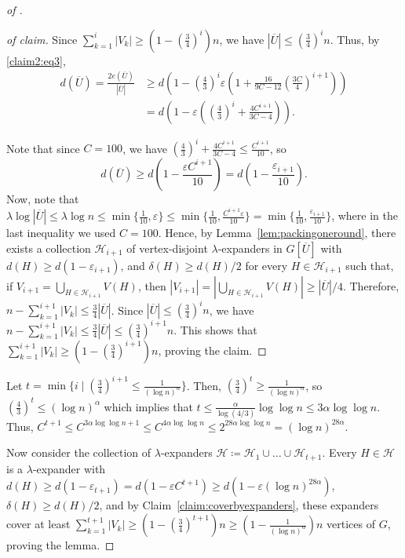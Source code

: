 \documentclass[10pt,a4paper]{amsart}
\newcommand{\cH}{\mathcal{H}}
\newcommand{\eps}{\varepsilon}
\begin{document}
\begin{proof}[ of ]
\begin{proof}[ of claim]
		Since $\sum_{k = 1}^i |V_k| \ge (1 - (\frac{3}{4})^i)n$, we have $|\overline{U}| \le (\frac{3}{4})^i n$. Thus, by \eqref{claim2:eq3}, 
		\begin{align*}
			d(\overline{U}) 
			= \frac{2 e(\overline{U})}{|\overline{U}|} 
			& \ge d\left(1 - \left(\frac{4}{3}\right)^i \eps \left(1 + \frac{16}{9C - 12} \left(\frac{3 C}{4}\right)^{i+1}  \right) \right) \\
			& = d \left(1 - \eps \left(\left(\frac{4}{3}\right)^i + \frac{4 C^{i+1}}{3C - 4}\right) \right).
		\end{align*}

		Note that since $C = 100$, we have $\left(\frac{4}{3}\right)^i + \frac{4 C^{i+1}}{3C - 4} \le \frac{C^{i+1}}{10}$, so
		\begin{equation*}
			d(\overline{U}) \ge d \left(1 - \frac{\eps C^{i+1}}{10}\right)  = d \left(1 - \frac{\eps_{i+1}}{10}\right).
		\end{equation*}
		Now, note that $\lambda \log |\overline{U}| \le \lambda \log n \le \min \{ \frac{1}{10},  \eps \} \le \min \{ \frac{1}{10},  \frac{C^{i+1} \eps}{10} \} = \min \{ \frac{1}{10},  \frac{\eps_{i+1}}{10} \}$, where in the last inequality we used $C = 100$. Hence, by Lemma~\ref{lem:packingoneround}, there exists a collection $\cH_{i+1}$ of vertex-disjoint $\lambda$-expanders in $G[\overline{U}]$ with $d(H) \ge d(1 - \eps_{i+1})$, and $\delta(H) \ge d(H)/2$ for every $H \in \cH_{i+1}$ such that, if $V_{i+1} = \bigcup_{H \in \cH_{i+1}} V(H)$, then $|V_{i+1}| = |\bigcup_{H \in \cH_{i+1}} V(H)|\ge |\overline{U}|/4$. Therefore, $n - \sum_{k = 1}^{i+1} |V_k| \le \frac{3}{4}|\overline{U}|$. Since $|\overline{U}| \le (\frac{3}{4})^i n$, we have 
		$ n - \sum_{k = 1}^{i+1} |V_k| \le \frac{3}{4}|\overline{U}| \le (\frac{3}{4})^{i+1}n.$ This shows that $\sum_{k = 1}^{i+1} |V_k| \ge (1-(\frac{3}{4})^{i+1})n$, proving the claim.
	\end{proof}

Let $t = \min \{ i \mid  (\frac{3}{4})^{i+1} \le \frac{1}{(\log n)^{\alpha}}\}$. Then, $(\frac{3}{4})^t \ge \frac{1}{(\log n)^{\alpha}}$, so $(\frac{4}{3})^t \le (\log n)^{\alpha}$ which implies that $t \le \frac{\alpha }{\log (4/3)} \log\log n \le 3 \alpha \log\log n$. Thus, $C^{t+1} \le C^{3 \alpha \log\log n + 1} \le C^{4 \alpha \log\log n} \le 2^{28 \alpha \log\log n}  = (\log n)^{28 \alpha}.$ 

Now consider the collection of $\lambda$-expanders $\cH \coloneqq \cH_1 \cup \ldots \cup \cH_{t+1}$. Every $H \in \cH$ is a $\lambda$-expander with $d(H) \ge d(1 - \eps_{t+1}) = d(1 - \eps C^{t+1}) \ge d(1 - \eps (\log n)^{28 \alpha})$, $\delta(H) \ge d(H)/2$, and by Claim~\ref{claim:coverbyexpanders}, these expanders cover at least $\sum_{k = 1}^{t+1} |V_k| \ge (1 - (\frac{3}{4})^{t+1})n \ge (1 - \frac{1}{(\log n)^{\alpha}})n$ vertices of $G$, proving the lemma.
\end{proof}
\end{document}
